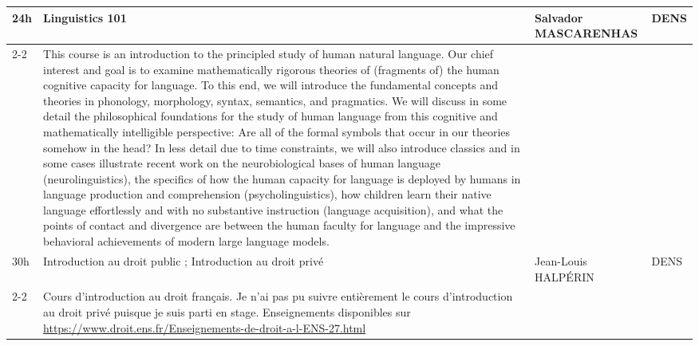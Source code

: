 \documentclass[a4paper]{article}
\def\cours#1#2#3#4#5{
  \midrule
  #1 & #2 & #3 & #4\\
\cmidrule(r){2-2}
     & #5 & & \\
}
\begin{document}
\begin{center}
\begin{longtable}{p{}|p{}|p{}|l}
		\cours{24h}{Linguistics 101}{Salvador MASCARENHAS}{DENS}{This course is an introduction to the principled study of human natural language. Our chief interest and goal is to examine mathematically rigorous theories of (fragments of) the human cognitive capacity for language. To this end, we will introduce the fundamental concepts and theories in phonology, morphology, syntax, semantics, and pragmatics. We will discuss in some detail the philosophical foundations for the study of human language from this cognitive and mathematically intelligible perspective: Are all of the formal symbols that occur in our theories somehow in the head?
			In less detail due to time constraints, we will also introduce classics and in some cases illustrate recent work on the neurobiological bases of human language (neurolinguistics), the specifics of how the human capacity for language is deployed by humans in language production and comprehension (psycholinguistics), how children learn their native language effortlessly and with no substantive instruction (language acquisition), and what the points of contact and divergence are between the human faculty for language and the impressive behavioral achievements of modern large language models.}
		\cours{30h}{Introduction au droit public ; Introduction au droit privé}{Jean-Louis HALPÉRIN}{DENS}{Cours d'introduction au droit français. Je n'ai pas pu suivre entièrement le cours d'introduction au droit privé puisque je suis parti en stage. Enseignements disponibles sur \url{https://www.droit.ens.fr/Enseignements-de-droit-a-l-ENS-27.html}}
	\end{longtable}
\end{center}
\end{document}
